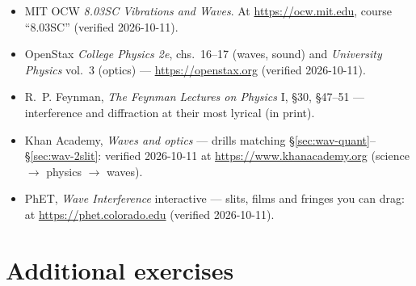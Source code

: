 \begin{itemize}
\item MIT OCW \emph{8.03SC Vibrations and Waves}. At
\url{https://ocw.mit.edu}, course ``8.03SC'' (verified 2026-10-11).
\item OpenStax \emph{College Physics 2e}, chs.~16--17 (waves, sound)
and \emph{University Physics} vol.~3 (optics) ---
\url{https://openstax.org} (verified 2026-10-11).
\item R.~P. Feynman, \emph{The Feynman Lectures on Physics} I,
\S30, \S47--51 --- interference and diffraction at their most lyrical
(in print).
\item Khan Academy, \emph{Waves and optics} --- drills matching
\S\ref{sec:wav-quant}--\S\ref{sec:wav-2slit}: verified 2026-10-11 at
\url{https://www.khanacademy.org} (science $\to$ physics $\to$ waves).
\item PhET, \emph{Wave Interference} interactive --- slits, films and
fringes you can drag: at \url{https://phet.colorado.edu} (verified
2026-10-11).
\end{itemize}

\section*{Additional exercises}


